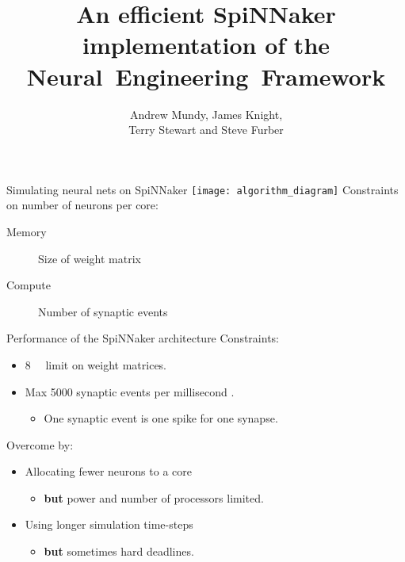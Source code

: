 \documentclass[t]{beamer}
\title{An efficient SpiNNaker implementation of the Neural~Engineering~Framework}
\author{Andrew Mundy, James Knight,\\Terry Stewart and Steve Furber}
\begin{document}
  \maketitle

  \begin{frame}{Simulating neural nets on SpiNNaker}
    \vfill
    \hspace*{-.15\textwidth}\texttt{[image: algorithm\_diagram]}
    \vfill
    \pause
    Constraints on number of neurons per core:
    \begin{description}
      \item[Memory] Size of weight matrix
      \item[Compute] Number of synaptic events
    \end{description}
  \end{frame}

  \begin{frame}{Performance of the SpiNNaker architecture}
    Constraints:
    \begin{itemize}
      \item \SI{8}{\mebi\byte} limit on weight matrices.
      \item Max \num{5000} synaptic events per millisecond \parencite{Sharp2013}.
      \begin{itemize}
        \item One synaptic event is one spike for one synapse.
      \end{itemize}
    \end{itemize}

    \pause
    Overcome by:
    \begin{itemize}[<+->]
      \item Allocating fewer neurons to a core
        \begin{itemize}
          \item \textbf{but} power and number of processors limited.
        \end{itemize}
      \item Using longer simulation time-steps
        \begin{itemize}
          \item \textbf{but} sometimes hard deadlines.
        \end{itemize}
    \end{itemize}
  \end{frame}
\end{document}
